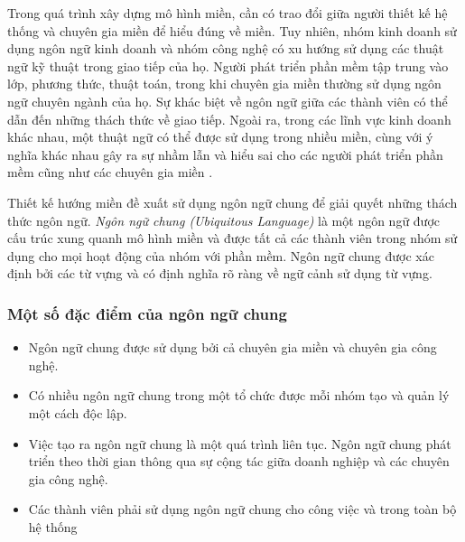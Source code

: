 









Trong quá trình xây dựng mô hình miền, cần có trao đổi giữa người thiết kế hệ thống và chuyên gia  miền    để hiểu đúng về miền. Tuy nhiên, nhóm kinh doanh sử dụng ngôn ngữ kinh doanh và nhóm công nghệ có xu hướng sử dụng các thuật ngữ kỹ thuật trong giao tiếp của họ. Người phát triển phần mềm tập trung vào lớp, phương thức, thuật toán, trong khi chuyên gia  miền    thường sử dụng ngôn ngữ chuyên ngành của họ. Sự khác biệt về ngôn ngữ giữa các thành viên có thể dẫn đến những thách thức về giao tiếp. Ngoài ra, trong các lĩnh vực kinh doanh khác nhau, một thuật ngữ có thể được sử dụng trong nhiều miền, cùng với ý nghĩa khác nhau gây ra sự nhầm lẫn và hiểu sai cho các người phát triển phần mềm cũng như các chuyên gia  miền   .

Thiết kế hướng miền đề xuất sử dụng ngôn ngữ chung để giải quyết những thách thức ngôn ngữ. \emph{Ngôn ngữ chung (Ubiquitous Language)} là một ngôn ngữ được cấu trúc xung quanh mô hình miền và được tất cả các thành viên trong nhóm sử dụng cho mọi hoạt động của nhóm với phần mềm. Ngôn ngữ chung được xác định bởi các từ vựng và có định nghĩa rõ ràng về ngữ cảnh sử dụng từ vựng.

\subsubsection{Một số đặc điểm của ngôn ngữ chung}

\begin{itemize}

    \item Ngôn ngữ chung được sử dụng bởi cả chuyên gia  miền    và chuyên gia công nghệ.

    \item Có nhiều ngôn ngữ chung trong một tổ chức được mỗi nhóm tạo và quản lý một cách độc lập.

    \item Việc tạo ra ngôn ngữ chung là một quá trình liên tục. Ngôn ngữ chung phát triển theo thời gian thông qua sự cộng tác giữa doanh nghiệp và các chuyên gia công nghệ.

    \item Các thành viên phải sử dụng ngôn ngữ chung cho công việc và trong toàn bộ hệ thống

\end{itemize}

